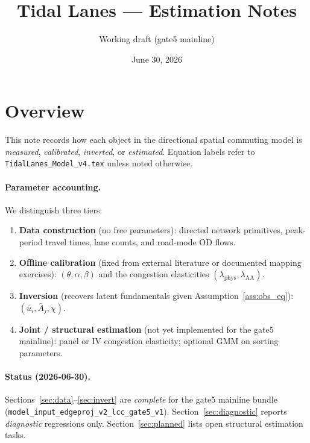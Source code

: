 \documentclass[11pt]{article}
\title{Tidal Lanes --- Estimation Notes}
\author{Working draft (gate5 mainline)}
\date{June 30, 2026}
\newcommand{\ubar}{\bar u}
\newcommand{\Abar}{\bar A}
\newcommand{\phys}{\mathrm{phys}}
\newcommand{\AAcal}{\mathrm{AA}}
\begin{document}
\maketitle

\section{Overview}\label{sec:overview}

This note records how each object in the directional spatial commuting
model is \emph{measured}, \emph{calibrated}, \emph{inverted}, or
\emph{estimated}.  Equation labels refer to
\texttt{TidalLanes\_Model\_v4.tex} unless noted otherwise.

\paragraph{Parameter accounting.}
We distinguish three tiers:
\begin{enumerate}[leftmargin=2em]
  \item \textbf{Data construction} (no free parameters): directed
        network primitives, peak-period travel times, lane counts, and
        road-mode OD flows.
  \item \textbf{Offline calibration} (fixed from external literature or
        documented mapping exercises): $(\theta,\alpha,\beta)$ and the
        congestion elasticities $(\lambda_{\phys},\lambda_{\AAcal})$.
  \item \textbf{Inversion} (recovers latent fundamentals given
        Assumption~\ref{ass:obs_eq}): $(\ubar_i,\Abar_j,\chi)$.
  \item \textbf{Joint / structural estimation} (not yet implemented for
        the gate5 mainline): panel or IV congestion elasticity; optional
        GMM on sorting parameters.
\end{enumerate}

\paragraph{Status (2026-06-30).}
Sections~\ref{sec:data}--\ref{sec:invert} are \emph{complete} for the
gate5 mainline bundle
(\texttt{model\_input\_edgeproj\_v2\_lcc\_gate5\_v1}).
Section~\ref{sec:diagnostic} reports \emph{diagnostic} regressions only.
Section~\ref{sec:planned} lists open structural estimation tasks.
\end{document}

